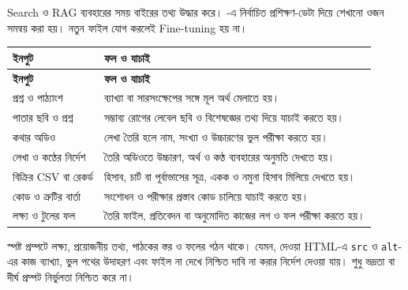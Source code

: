 Search ও RAG ব্যবহারের সময় বাইরের তথ্য উদ্ধার করে। -এ নির্বাচিত প্রশিক্ষণ-ডেটা দিয়ে শেখানো ওজন সমন্বয় করা হয়। নতুন ফাইল যোগ করলেই Fine-tuning হয় না।
\begin{compacttable}
\begin{longtable}{|p{}|p{}|}
\hline\textbf{ইনপুট} & \textbf{ফল ও যাচাই}\\\hline\endfirsthead
\hline\textbf{ইনপুট} & \textbf{ফল ও যাচাই}\\\hline\endhead
প্রশ্ন ও পাঠ্যাংশ & ব্যাখ্যা বা সারসংক্ষেপের সঙ্গে মূল অর্থ মেলাতে হয়।\\\hline
পাতার ছবি ও প্রশ্ন & সম্ভাব্য রোগের লেবেল ছবি ও বিশেষজ্ঞের তথ্য দিয়ে যাচাই করতে হয়।\\\hline
কথার অডিও & লেখা তৈরি হলে নাম, সংখ্যা ও উচ্চারণের ভুল পরীক্ষা করতে হয়।\\\hline
লেখা ও কণ্ঠের নির্দেশ & তৈরি অডিওতে উচ্চারণ, অর্থ ও কণ্ঠ ব্যবহারের অনুমতি দেখতে হয়।\\\hline
বিক্রির CSV বা রেকর্ড & হিসাব, চার্ট বা পূর্বাভাসের সূত্র, একক ও নমুনা হিসাব মিলিয়ে দেখতে হয়।\\\hline
কোড ও ত্রুটির বার্তা & সংশোধন ও পরীক্ষার প্রস্তাব কোড চালিয়ে যাচাই করতে হয়।\\\hline
লক্ষ্য ও টুলের ফল & তৈরি ফাইল, প্রতিবেদন বা অনুমোদিত কাজের লগ ও ফল পরীক্ষা করতে হয়।\\\hline
\end{longtable}
\end{compacttable}
স্পষ্ট প্রম্পটে লক্ষ্য, প্রয়োজনীয় তথ্য, পাঠকের স্তর ও ফলের গঠন থাকে। যেমন, দেওয়া HTML-এ \texttt{src} ও \texttt{alt}-এর কাজ ব্যাখ্যা, ভুল পথের উদাহরণ এবং ফাইল না দেখে নিশ্চিত দাবি না করার নির্দেশ দেওয়া যায়। শুধু ভদ্রতা বা দীর্ঘ প্রম্পট নির্ভুলতা নিশ্চিত করে না।
